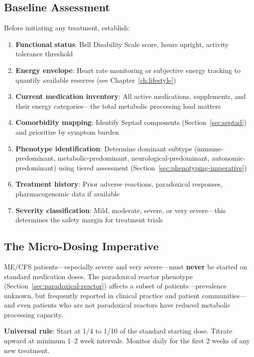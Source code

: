 \subsection{Baseline Assessment}
\label{subsec:baseline-assessment}

Before initiating any treatment, establish:

\begin{enumerate}
    \item \textbf{Functional status}: Bell Disability Scale score, hours upright, activity tolerance threshold
    \item \textbf{Energy envelope}: Heart rate monitoring or subjective energy tracking to quantify available reserves (see Chapter~\ref{ch:lifestyle})
    \item \textbf{Current medication inventory}: All active medications, supplements, and their energy categories---the total metabolic processing load matters
    \item \textbf{Comorbidity mapping}: Identify Septad components (Section~\ref{sec:septad}) and prioritize by symptom burden
    \item \textbf{Phenotype identification}: Determine dominant subtype (immune-predominant, metabolic-predominant, neurological-predominant, autonomic-predominant) using tiered assessment (Section~\ref{sec:phenotyping-imperative})
    \item \textbf{Treatment history}: Prior adverse reactions, paradoxical responses, pharmacogenomic data if available
    \item \textbf{Severity classification}: Mild, moderate, severe, or very severe---this determines the safety margin for treatment trials
\end{enumerate}

\subsection{The Micro-Dosing Imperative}
\label{subsec:microdosing}

\begin{warning}
\label{warn:never-standard-doses}
ME/CFS patients---especially severe and very severe---must \textbf{never} be started on standard medication doses. The paradoxical reactor phenotype (Section~\ref{sec:paradoxical-reactor}) affects a subset of patients---prevalence unknown, but frequently reported in clinical practice and patient communities---and even patients who are not paradoxical reactors have reduced metabolic processing capacity.

\textbf{Universal rule}: Start at 1/4 to 1/10 of the standard starting dose. Titrate upward at minimum 1--2 week intervals. Monitor daily for the first 2 weeks of any new treatment.
\end{warning}


